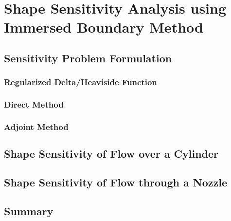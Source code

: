 \chapter{Shape Sensitivity Analysis using Immersed Boundary Method}

\section{Sensitivity Problem Formulation}
\lipsum[2-7]
\subsection{Regularized Delta/Heaviside Function}
\lipsum[2-22]
\subsection{Direct Method}
\lipsum[2-15]
\subsection{Adjoint Method}
\lipsum[2-10]
\section{Shape Sensitivity of Flow over a Cylinder}
\lipsum[2-34]
\section{Shape Sensitivity of Flow through a Nozzle}
\lipsum[2-28]
\section{Summary}
\lipsum[2-5]
